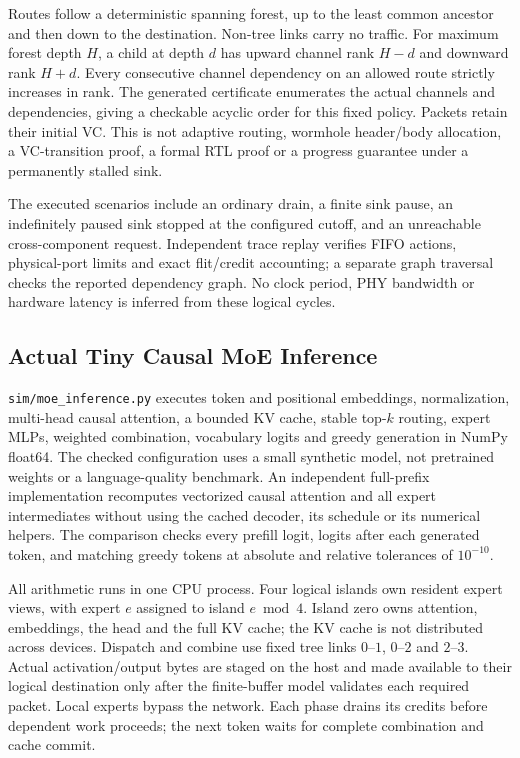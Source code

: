 \documentclass[11pt,a4paper]{article}
\begin{document}
Routes follow a deterministic spanning forest, up to the least common
ancestor and then down to the destination. Non-tree links carry no traffic.
For maximum forest depth $H$, a child at depth $d$ has upward channel rank
$H-d$ and downward rank $H+d$. Every consecutive channel dependency on an
allowed route strictly increases in rank. The generated certificate enumerates
the actual channels and dependencies, giving a checkable acyclic order for
this fixed policy. Packets retain their initial VC. This is not adaptive
routing, wormhole header/body allocation, a VC-transition proof, a formal RTL
proof or a progress guarantee under a permanently stalled sink.

The executed scenarios include an ordinary drain, a finite sink pause, an
indefinitely paused sink stopped at the configured cutoff, and an unreachable
cross-component request. Independent trace replay verifies FIFO actions,
physical-port limits and exact flit/credit accounting; a separate graph
traversal checks the reported dependency graph. No clock period, PHY bandwidth
or hardware latency is inferred from these logical cycles.

\subsection{Actual Tiny Causal MoE Inference}

\texttt{sim/moe\_inference.py} executes token and positional embeddings,
normalization, multi-head causal attention, a bounded KV cache, stable
top-$k$ routing, expert MLPs, weighted combination, vocabulary logits and
greedy generation in NumPy float64. The checked configuration uses a small
synthetic model, not pretrained weights or a language-quality benchmark.
An independent full-prefix implementation recomputes vectorized causal
attention and all expert intermediates without using the cached decoder,
its schedule or its numerical helpers. The comparison checks every prefill
logit, logits after each generated token, and matching greedy tokens at
absolute and relative tolerances of $10^{-10}$.

All arithmetic runs in one CPU process. Four logical islands own resident
expert views, with expert $e$ assigned to island $e\bmod4$. Island zero owns
attention, embeddings, the head and the full KV cache; the KV cache is not
distributed across devices. Dispatch and combine use fixed tree links
$0$--$1$, $0$--$2$ and $2$--$3$. Actual activation/output bytes are staged
on the host and made available to their logical destination only after the
finite-buffer model validates each required packet. Local experts bypass
the network. Each phase drains its credits before dependent work proceeds;
the next token waits for complete combination and cache commit.
\end{document}
